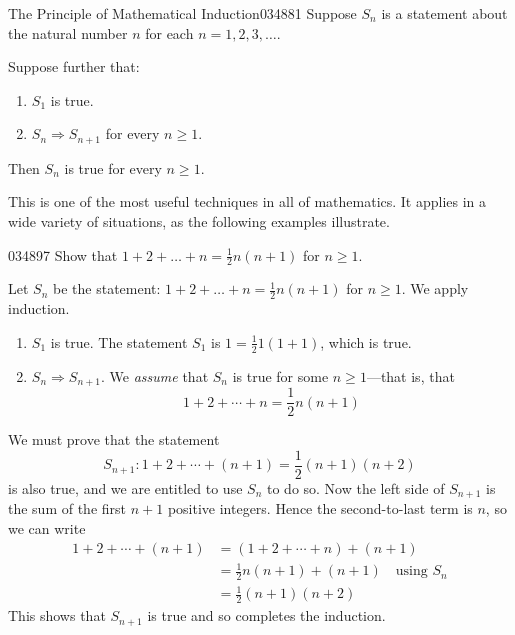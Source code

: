 \newpage
\begin{theorem*}{The Principle of Mathematical Induction}{034881}
Suppose $S_{n}$ is a statement about the natural number $n$ for each $n = 1, 2, 3, \dots$.


Suppose further that:


\begin{enumerate}
\item $S_{1}$ is true.

\item $S_{n} \Rightarrow S_{n+1}$ for every $n \geq 1$.

\end{enumerate}

Then $S_{n}$ is true for every $n \geq 1$.
\end{theorem*}

\noindent This is one of the most useful 
techniques in all of mathematics. It applies in a wide variety of 
situations, as the following examples illustrate.


\begin{example}{}{034897}
Show that $1 + 2 + \dots + n = \frac{1}{2}n(n + 1)$ for $n \geq 1$.


\begin{solution}
  Let $S_{n}$ be the statement: $1 + 2 + \dots  + n = \frac{1}{2}n(n + 1)$ for $n \geq 1$. We apply induction.
\begin{enumerate}
\item $S_{1}$ is true. The statement $S_{1}$ is $1 = \frac{1}{2}1(1 + 1)$, which is true.

\item $S_{n} \Rightarrow S_{n+1}$. We \textit{assume} that $S_{n}$ is true for some $n \geq 1$---that is, that
\begin{equation*}
1+ 2 + \cdots + n = \frac{1}{2} n(n+1)
\end{equation*}
\end{enumerate}
We must prove that the statement
\begin{equation*}
S_{n+1} : 1 + 2 + \cdots + (n+1) = \frac{1}{2} (n+1)(n+2)
\end{equation*}
is also true, and we are entitled to use $S_{n}$ to do so. Now the left side of $S_{n+1}$ is the sum of the first $n + 1$ positive integers. Hence the second-to-last term is $n$, so we can write
\begin{align*}
1 + 2 + \cdots + (n+1) & = (1 + 2+ \cdots + n)+(n+1) \\
&= \frac{1}{2} n(n+1) + (n+1) \quad \mbox{using } S_n \\
& = \frac{1}{2}(n+1)(n+2)
\end{align*}
This shows that $S_{n+1}$ is true and so completes the induction.
\end{solution}
\end{example}

